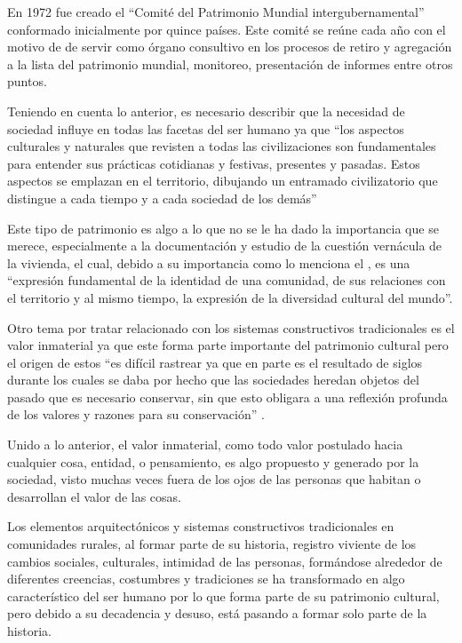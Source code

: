 En 1972 fue creado el ``Comité del Patrimonio Mundial intergubernamental'' conformado inicialmente por quince países. Este comité se reúne cada año con el motivo de de servir como órgano consultivo en los procesos de retiro y agregación a la lista del patrimonio mundial, monitoreo, presentación de informes entre otros puntos.

Teniendo en cuenta lo anterior, es necesario describir que la necesidad de sociedad influye en todas las facetas del ser humano ya que ``los aspectos culturales y naturales que revisten a todas las civilizaciones son fundamentales para entender sus prácticas cotidianas y festivas, presentes y pasadas. Estos aspectos se emplazan en el territorio, dibujando un entramado civilizatorio que distingue a cada tiempo y a cada sociedad de los demás''\cite*[p. 1]{rodriguezestudio}

Este tipo de patrimonio es algo a lo que no se le ha dado la importancia que se merece, especialmente a la documentación y estudio de la cuestión vernácula de la vivienda, el cual, debido a su importancia como lo menciona el \cite{icomos1999carta}, es una ``expresión fundamental de la identidad de una comunidad, de sus relaciones con el territorio y al mismo tiempo, la expresión de la diversidad cultural del mundo''.

Otro tema por tratar relacionado con los sistemas constructivos tradicionales es el valor inmaterial ya que este forma parte importante del patrimonio cultural pero el origen de estos ``es difícil rastrear ya que en parte es el resultado de siglos durante los cuales se daba por hecho que las sociedades heredan objetos del pasado que es necesario conservar, sin que esto obligara a una reflexión profunda de los valores y razones para su conservación'' \citep[p. 6]{villasenor2011valor}.

Unido a lo anterior, el valor inmaterial, como todo valor postulado hacia cualquier cosa, entidad, o pensamiento, es algo propuesto y generado por la sociedad, visto muchas veces fuera de los ojos de las personas que habitan o desarrollan el valor de las cosas.

Los elementos arquitectónicos y sistemas constructivos tradicionales en comunidades rurales, al formar parte de su historia, registro viviente de los cambios sociales, culturales, intimidad de las personas, formándose alrededor de diferentes creencias, costumbres y tradiciones se ha transformado en algo característico del ser humano por lo que forma parte de su patrimonio cultural, pero debido a su decadencia y desuso, está pasando a formar solo parte de la historia.

